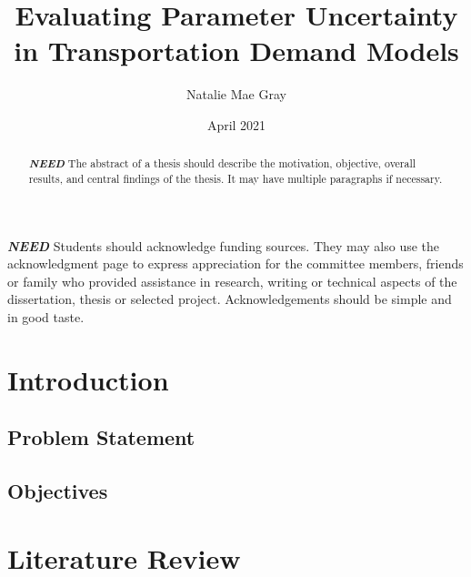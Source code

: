 \documentclass[fancy, masters,twoside]{byuthesis}
\title{Evaluating Parameter Uncertainty in Transportation Demand Models}
\author{Natalie Mae Gray}
\date{April 2021}
\begin{document}
	\frontmatter

	\titlepage
	\cleardoublepage

	\customtitlepage
	\cleardoublepage


    \begin{abstract}
  \textbf{\emph{NEED}} The abstract of a thesis should describe the
  motivation, objective, overall results, and central findings of the thesis.
  It may have multiple paragraphs if necessary.
  \end{abstract}
  	\cleardoublepage


    \begin{acknowledgments}
  \textbf{\emph{NEED}} Students should acknowledge funding sources. They may also use the
  acknowledgment page to express appreciation for the committee members, friends
  or family who provided assistance in research, writing or technical aspects of
  the dissertation, thesis or selected project. Acknowledgements should be simple
  and in good taste.
  \end{acknowledgments}
  	\cleardoublepage

	\tableofcontents*
	\cleardoublepage

	\listoffigures
	\cleardoublepage

	\listoftables
	\cleardoublepage

	
	\cleardoublepage

	\mainmatter

\hypertarget{introduction}{%
\chapter{Introduction}\label{introduction}}

\hypertarget{problem-statement}{%
\section{Problem Statement}\label{problem-statement}}

\hypertarget{objectives}{%
\section{Objectives}\label{objectives}}

\hypertarget{literature-review}{%
\chapter{Literature Review}\label{literature-review}}
\end{document}
